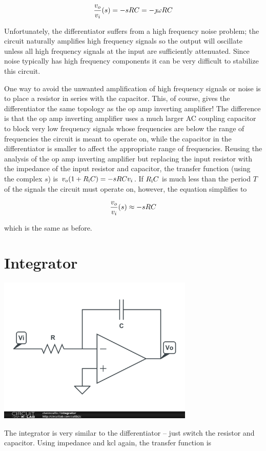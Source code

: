 \textcolor{red}{
\begin{equation}
\frac{v_o}{v_i}(s) = -sRC = -\jmath \omega RC
\label{eq:differentiator_complex}
\end{equation}
}

Unfortunately, the differentiator suffers from a high frequency noise problem; the circuit naturally amplifies high frequency signals so the output will oscillate unless all high frequency signals at the input are sufficiently attenuated.
Since noise typically has high frequency components it can be very difficult to stabilize this circuit.

One way to avoid the unwanted amplification of high frequency signals or noise is to place a resistor in series with the capacitor.
This, of course, gives the differentiator the same topology as the op amp inverting amplifier!
The difference is that the op amp inverting amplifier uses a much larger AC coupling capacitor to block very low frequency signals whose frequencies are below the range of frequencies the circuit is meant to operate on, while the capacitor in the differentiator is smaller to affect the appropriate range of frequencies.
Reusing the analysis of the op amp inverting amplifier but replacing the input resistor with the impedance of the input resistor and capacitor, the transfer function (using the complex $s$) is $v_o(1+R_\mathrm{i} C) = -sRCv_i$. If $R_\mathrm{i} C$ is much less than the period $T$ of the signals the circuit must operate on, however, the equation simplifies to

\textcolor{red}{
\begin{equation}
\frac{v_o}{v_i}(s) \approx -sRC
\label{eq:differentiator_series_cap}
\end{equation}
}

which is the same as before. \autocite[79-80]{op-amp-circuits-johnson}

\section{Integrator}
\begin{center}
	\includegraphics[width=0.70\textwidth]{schematics/integrator.PNG}
\end{center}
The integrator is very similar to the differentiator -- just switch the resistor and capacitor. Using impedance and \ac{kcl} again, the transfer function is

